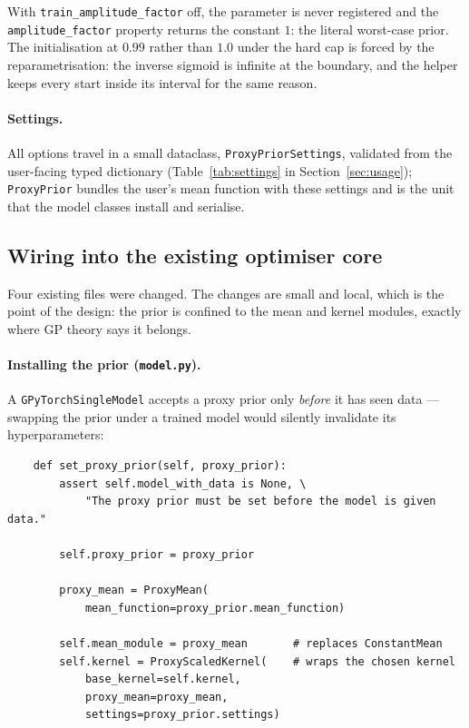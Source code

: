 \documentclass[11pt,a4paper]{article}
\newcommand{\code}[1]{\texttt{#1}}
\begin{document}
With \code{train\_amplitude\_factor} off, the parameter is never registered
and the \code{amplitude\_factor} property returns the constant $1$: the
literal worst-case prior. The initialisation at $0.99$ rather than $1.0$
under the hard cap is forced by the reparametrisation: the inverse sigmoid is
infinite at the boundary, and the helper keeps every start inside its
interval for the same reason.

\paragraph{Settings.} All options travel in a small dataclass,
\code{ProxyPriorSettings}, validated from the user-facing typed dictionary
(Table~\ref{tab:settings} in Section~\ref{sec:usage}); \code{ProxyPrior}
bundles the user's mean function with these settings and is the unit that the
model classes install and serialise.

\subsection{Wiring into the existing optimiser core}
\label{sec:wiring}

Four existing files were changed. The changes are small and local, which is
the point of the design: the prior is confined to the mean and kernel
modules, exactly where GP theory says it belongs.

\paragraph{Installing the prior (\code{model.py}).} A
\code{GPyTorchSingleModel} accepts a proxy prior only \emph{before} it has
seen data --- swapping the prior under a trained model would silently
invalidate its hyperparameters:

\begin{lstlisting}
    def set_proxy_prior(self, proxy_prior):
        assert self.model_with_data is None, \
            "The proxy prior must be set before the model is given data."

        self.proxy_prior = proxy_prior

        proxy_mean = ProxyMean(
            mean_function=proxy_prior.mean_function)

        self.mean_module = proxy_mean       # replaces ConstantMean
        self.kernel = ProxyScaledKernel(    # wraps the chosen kernel
            base_kernel=self.kernel,
            proxy_mean=proxy_mean,
            settings=proxy_prior.settings)
\end{lstlisting}
\end{document}

